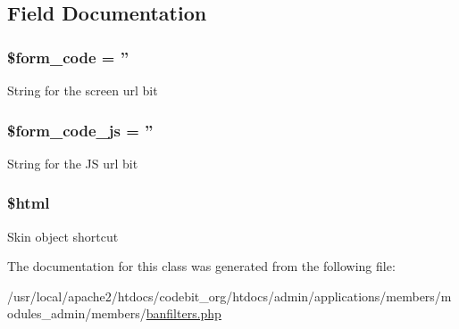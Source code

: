 \subsection{Field Documentation}
\hypertarget{classadmin__members__members__banfilters_af28aee726fa3eb6c355d08a2ab655e03}{
\subsubsection[{\$form\-\_\-code}]{\setlength{\rightskip}{0pt plus 5cm}\$form\-\_\-code = ''}}\label{classadmin__members__members__banfilters_af28aee726fa3eb6c355d08a2ab655e03}
String for the screen url bit \hypertarget{classadmin__members__members__banfilters_ac68fe8a02a2efd63c3271179f4b4fbb7}{
\subsubsection[{\$form\-\_\-code\-\_\-js}]{\setlength{\rightskip}{0pt plus 5cm}\$form\-\_\-code\-\_\-js = ''}}\label{classadmin__members__members__banfilters_ac68fe8a02a2efd63c3271179f4b4fbb7}
String for the J\-S url bit \hypertarget{classadmin__members__members__banfilters_a6f96e7fc92441776c9d1cd3386663b40}{
\subsubsection[{\$html}]{\setlength{\rightskip}{0pt plus 5cm}\$html}}\label{classadmin__members__members__banfilters_a6f96e7fc92441776c9d1cd3386663b40}
Skin object shortcut 

The documentation for this class was generated from the following file\-:\begin{DoxyCompactItemize}
\item 
/usr/local/apache2/htdocs/codebit\-\_\-org/htdocs/admin/applications/members/modules\-\_\-admin/members/\hyperlink{banfilters_8php}{banfilters.\-php}\end{DoxyCompactItemize}
